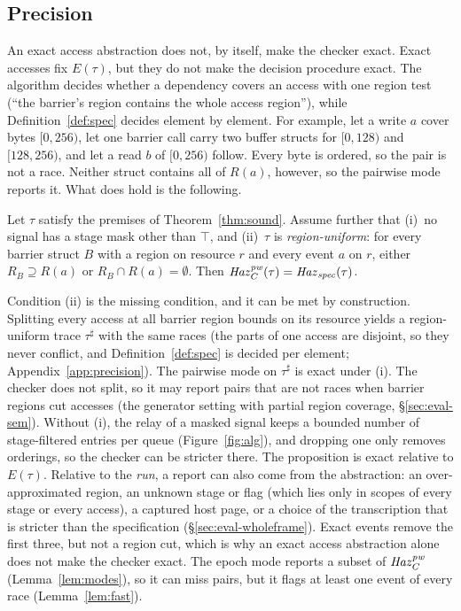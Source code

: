 \subsection{Precision}
\label{sec:precision}

An exact access abstraction does not, by itself, make the checker exact. Exact accesses fix $E(\tau)$, but they do
not make the decision procedure exact. The algorithm decides whether a
dependency covers an access with one region test (``the barrier's region contains the whole access region''), while
Definition~\ref{def:spec} decides element by element. For example, let a write $a$ cover bytes $[0,256)$, let one
barrier call carry two buffer structs for $[0,128)$ and $[128,256)$, and let a read $b$ of $[0,256)$ follow. Every
byte is ordered, so the pair is not a race. Neither struct contains all of $R(a)$, however, so the pairwise mode
reports it. What does hold is the following.

\begin{proposition}\label{thm:complete}
Let $\tau$ satisfy the premises of Theorem~\ref{thm:sound}. Assume further that (i)~no signal has a stage mask other
than $\top$, and (ii)~$\tau$ is \emph{region-uniform}: for every barrier struct $B$ with a region on resource $r$ and
every event $a$ on $r$, either $R_B \supseteq R(a)$ or $R_B \cap R(a) = \emptyset$. Then $\mathit{Haz}_C^{\mathit{pw}}(\tau) = \mathit{Haz}_{\mathit{spec}}(\tau)$.
\end{proposition}

Condition (ii) is the missing condition, and it can be met by construction. Splitting every access at all barrier
region bounds on its resource yields a region-uniform trace $\tau^\sharp$ with the same races (the parts of one access
are disjoint, so they never conflict, and Definition~\ref{def:spec} is decided per element; Appendix~\ref{app:precision}).
The pairwise mode on $\tau^\sharp$ is exact under (i). The checker does not split, so it may report
pairs that are not races when barrier regions cut accesses (the generator setting with partial region coverage,
\S\ref{sec:eval-sem}).
Without (i), the relay of a masked signal keeps a bounded number of stage-filtered entries per queue
(Figure~\ref{fig:alg}), and dropping one only removes orderings, so the checker can be stricter there.
The proposition is exact relative to $E(\tau)$. Relative to the \emph{run}, a report can also come from the
abstraction: an over-approximated region, an unknown stage or flag (which lies only in scopes of every stage or every
access), a captured host page, or a choice of the transcription that is stricter than the specification
(\S\ref{sec:eval-wholeframe}). Exact events remove the first three, but not a region cut, which is why an exact access
abstraction alone does not make the checker exact. The epoch mode reports a subset of $\mathit{Haz}_C^{\mathit{pw}}$
(Lemma~\ref{lem:modes}), so it can miss pairs, but it flags at least one event of every race (Lemma~\ref{lem:fast}).

